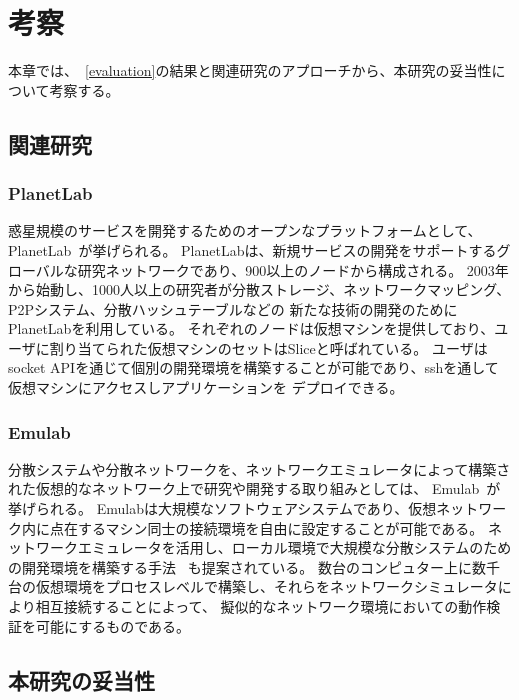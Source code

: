 \chapter{考察}
\label{consideration}

本章では、~\ref{evaluation}の結果と関連研究のアプローチから、本研究の妥当性について考察する。

\section{関連研究}
\label{consideration:related-works}

\subsection{PlanetLab}
\label{consideration:related-works:planetlab}

惑星規模のサービスを開発するためのオープンなプラットフォームとして、PlanetLab~\cite{PlanetLab}が挙げられる。
PlanetLabは、新規サービスの開発をサポートするグローバルな研究ネットワークであり、900以上のノードから構成される。
2003年から始動し、1000人以上の研究者が分散ストレージ、ネットワークマッピング、P2Pシステム、分散ハッシュテーブルなどの
新たな技術の開発のためにPlanetLabを利用している。
それぞれのノードは仮想マシンを提供しており、ユーザに割り当てられた仮想マシンのセットはSliceと呼ばれている。
ユーザはsocket APIを通じて個別の開発環境を構築することが可能であり、sshを通して仮想マシンにアクセスしアプリケーションを
デプロイできる。

\subsection{Emulab}
\label{consideration:related-works:emulab}

分散システムや分散ネットワークを、ネットワークエミュレータによって構築された仮想的なネットワーク上で研究や開発する取り組みとしては、
Emulab~\cite{Emulab}が挙げられる。
Emulabは大規模なソフトウェアシステムであり、仮想ネットワーク内に点在するマシン同士の接続環境を自由に設定することが可能である。
ネットワークエミュレータを活用し、ローカル環境で大規模な分散システムのための開発環境を構築する手法
~\cite{RelatedWork1}も提案されている。
数台のコンピュター上に数千台の仮想環境をプロセスレベルで構築し、それらをネットワークシミュレータにより相互接続することによって、
擬似的なネットワーク環境においての動作検証を可能にするものである。

\section{本研究の妥当性}

